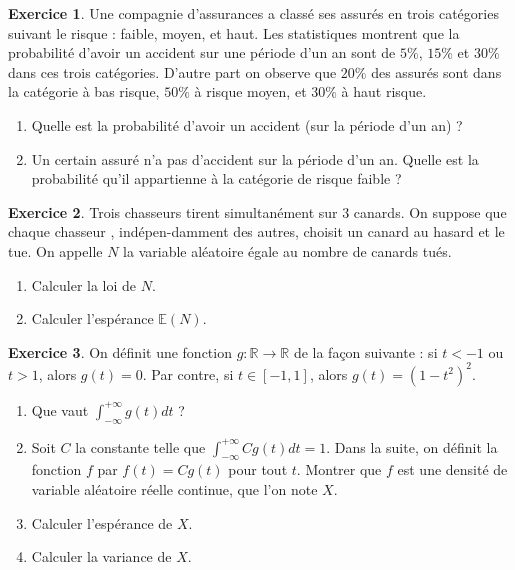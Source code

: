 \documentclass[11pt]{article}
\theoremstyle{definition}
\newtheorem{exo}{Exercice}
\begin{document}
 \begin{exo} 
 Une compagnie d'assurances a classé ses assurés en trois catégories suivant le risque : faible, moyen, et haut. Les statistiques montrent que la probabilité d'avoir un accident sur une période d'un an sont de $5\%$, $15\%$ et $30\%$ dans ces trois catégories. D'autre part on observe que $20\%$ des assurés sont dans la catégorie à bas risque, $50\%$ à risque moyen, et $30\%$ à haut risque.
 \begin{enumerate}
 \item Quelle est la probabilité d'avoir un accident (sur la période d'un an) ? 
 \item Un certain assuré n'a pas d'accident sur la période d'un an. Quelle est la probabilité qu'il appartienne à la catégorie de risque faible ?
 \end{enumerate}
 \end{exo}

\begin{exo}
     Trois chasseurs tirent simultan\'ement sur 3 canards. On suppose que chaque chasseur , ind\'epen-damment des autres, choisit un canard au hasard et le tue.
     On appelle $N$ la variable al\'eatoire \'egale au nombre de canards tu\'es. 
     \begin{enumerate}
     \item Calculer la loi de $N$.
     \item Calculer l'espérance $\mathbb E(N)$.
     \end{enumerate}
\end{exo}


\begin{exo}

On définit une fonction $g : \mathbb R\to \mathbb R$ de la façon suivante : si $t<-1$ ou $t>1$, alors $g(t)=0$. Par contre, si $t\in [-1,1]$, alors $g(t)=(1-t^2)^2$.

\begin{enumerate}
\item Que vaut $\displaystyle{ \int_{-\infty}^{+\infty} g(t)d\! t}$ ?
\item Soit $C$ la constante telle que $\int_{-\infty}^{+\infty} Cg(t)dt=1$. Dans la suite, on définit la fonction $f$ par $f(t)=Cg(t)
$ pour tout $t$. Montrer que $f$ est une densité de variable aléatoire réelle continue, que l'on note $X$.
\item Calculer l'espérance de $X$.
\item Calculer la variance de $X$.
\end{enumerate}
\end{exo}
\end{document}
